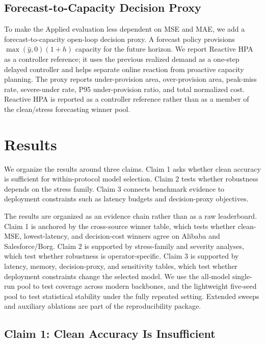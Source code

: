 \documentclass[conference]{IEEEtran}
\begin{document}
\subsection{Forecast-to-Capacity Decision Proxy}

To make the Applied evaluation less dependent on MSE and MAE, we add a forecast-to-capacity open-loop decision proxy. A forecast policy provisions $\max(\hat{y},0)(1+h)$ capacity for the future horizon. We report Reactive HPA as a controller reference; it uses the previous realized demand as a one-step delayed controller and helps separate online reaction from proactive capacity planning. The proxy reports under-provision area, over-provision area, peak-miss rate, severe-under rate, P95 under-provision ratio, and total normalized cost. Reactive HPA is reported as a controller reference rather than as a member of the clean/stress forecasting winner pool.

\section{Results}

We organize the results around three claims. Claim 1 asks whether clean accuracy is sufficient for within-protocol model selection. Claim 2 tests whether robustness depends on the stress family. Claim 3 connects benchmark evidence to deployment constraints such as latency budgets and decision-proxy objectives.

The results are organized as an evidence chain rather than as a raw leaderboard. Claim 1 is anchored by the cross-source winner table, which tests whether clean-MSE, lowest-latency, and decision-cost winners agree on Alibaba and Salesforce/Borg. Claim 2 is supported by stress-family and severity analyses, which test whether robustness is operator-specific. Claim 3 is supported by latency, memory, decision-proxy, and sensitivity tables, which test whether deployment constraints change the selected model. We use the all-model single-run pool to test coverage across modern backbones, and the lightweight five-seed pool to test statistical stability under the fully repeated setting. Extended sweeps and auxiliary ablations are part of the reproducibility package.



\subsection{Claim 1: Clean Accuracy Is Insufficient}
\end{document}
